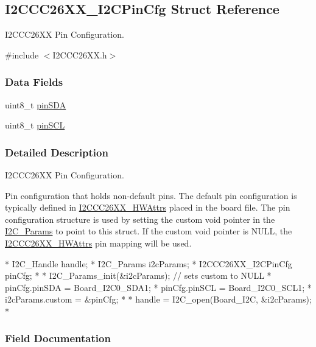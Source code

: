 \subsection{I2\-C\-C\-C26\-X\-X\-\_\-\-I2\-C\-Pin\-Cfg Struct Reference}
\label{struct_i2_c_c_c26_x_x___i2_c_pin_cfg}


I2\-C\-C\-C26\-X\-X Pin Configuration.  




{\ttfamily \#include $<$I2\-C\-C\-C26\-X\-X.\-h$>$}

\subsubsection*{Data Fields}
\begin{DoxyCompactItemize}
\item 
uint8\-\_\-t \hyperlink{struct_i2_c_c_c26_x_x___i2_c_pin_cfg_a07155d4bf6fac9ed7181eca65563e2c9}{pin\-S\-D\-A}
\item 
uint8\-\_\-t \hyperlink{struct_i2_c_c_c26_x_x___i2_c_pin_cfg_af6a6d421ac74746b80065a3e9de338d6}{pin\-S\-C\-L}
\end{DoxyCompactItemize}


\subsubsection{Detailed Description}
I2\-C\-C\-C26\-X\-X Pin Configuration. 

Pin configuration that holds non-\/default pins. The default pin configuration is typically defined in \hyperlink{struct_i2_c_c_c26_x_x___h_w_attrs}{I2\-C\-C\-C26\-X\-X\-\_\-\-H\-W\-Attrs} placed in the board file. The pin configuration structure is used by setting the custom void pointer in the \hyperlink{struct_i2_c___params}{I2\-C\-\_\-\-Params} to point to this struct. If the custom void pointer is N\-U\-L\-L, the \hyperlink{struct_i2_c_c_c26_x_x___h_w_attrs}{I2\-C\-C\-C26\-X\-X\-\_\-\-H\-W\-Attrs} pin mapping will be used. 
\begin{DoxyCode}
*  I2C_Handle handle;
*  I2C_Params i2cParams;
*  I2CCC26XX_I2CPinCfg pinCfg;
*
*  I2C_Params_init(&i2cParams);     \textcolor{comment}{// sets custom to NULL}
*  pinCfg.pinSDA = Board\_I2C0\_SDA1;
*  pinCfg.pinSCL = Board\_I2C0\_SCL1;
*  i2cParams.custom = &pinCfg;
*
*  handle = I2C_open(Board\_I2C, &i2cParams);
*  
\end{DoxyCode}
 

\subsubsection{Field Documentation}

